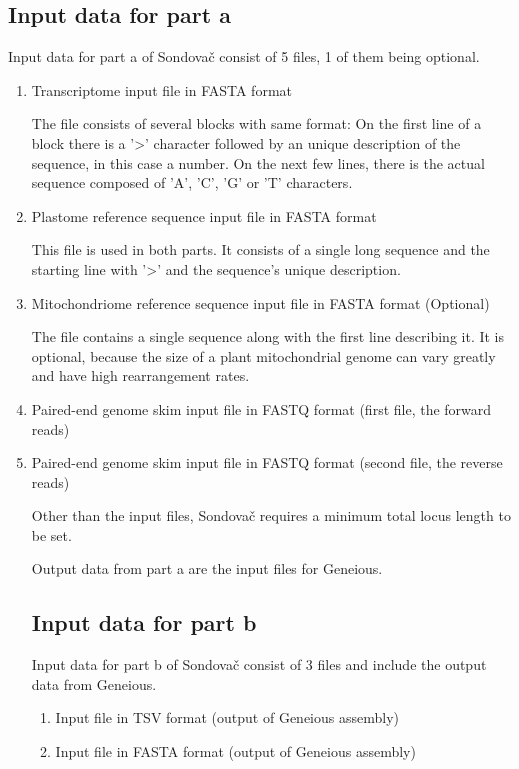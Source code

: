 \subsection{Input data for part a}
Input data for part a of Sondovač consist of 5 files, 1 of them being optional. 
\begin{enumerate}
\item Transcriptome input file in FASTA format

The file consists of several blocks with same format: On the first line of a block there is a '>' character followed 
by an unique description of the sequence, in this case a number. On the next few lines, there is the actual sequence 
composed of 'A', 'C', 'G' or 'T' characters. 
\item Plastome reference sequence input file in FASTA format

This file is used in both parts. It consists of a single long sequence and the starting line with '>' and the sequence's 
unique description. 

\item Mitochondriome reference sequence input file in FASTA format (Optional)

The file contains a single sequence along with the first line describing it. It is optional, because the size of a plant
mitochondrial genome can vary greatly and have high rearrangement rates. 

\item Paired-end genome skim input file in FASTQ format (first file, the forward reads)

\item Paired-end genome skim input file in FASTQ format (second file, the reverse reads)

Other than the input files, Sondovač requires a minimum total locus length to be set. 

Output data from part a are the input files for Geneious. 

\subsection{Input data for part b}
Input data for part b of Sondovač consist of 3 files and include the output data from Geneious. 
\begin{enumerate}

\item Input file in TSV format (output of Geneious assembly)

\item Input file in FASTA format (output of Geneious assembly)


\end{enumerate}
\end{enumerate}
